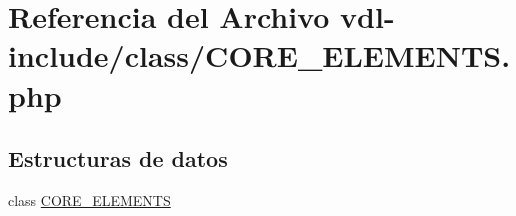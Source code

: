 \hypertarget{CORE__ELEMENTS_8php}{\section{Referencia del Archivo vdl-\/include/class/\-C\-O\-R\-E\-\_\-\-E\-L\-E\-M\-E\-N\-T\-S.php}
\label{CORE__ELEMENTS_8php}
}
\subsection*{Estructuras de datos}
\begin{DoxyCompactItemize}
\item 
class \hyperlink{classCORE__ELEMENTS}{C\-O\-R\-E\-\_\-\-E\-L\-E\-M\-E\-N\-T\-S}
\end{DoxyCompactItemize}

